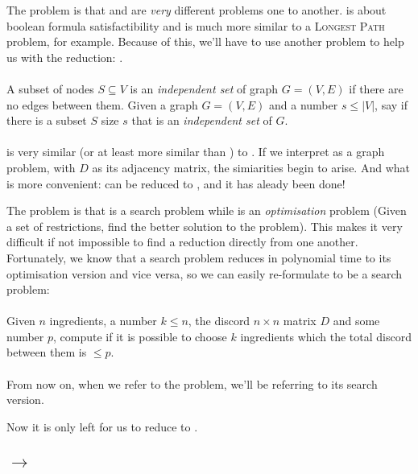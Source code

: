 The problem is that \tsat{} and \exc{} are \textit{very} different problems one to another. \tsat{} is about boolean formula satisfactibility and \exc{} is much more similar to a \textsc{Longest Path} problem, for example. Because of this, we'll have to use another problem to help us with the reduction: \is{}.

\paragraph{\is{}}
A subset of nodes $S \subseteq V$ is an \textit{independent set} of graph $G = (V,E)$ if there are no edges between them. Given a graph $G = (V,E)$ and a number $s \leq |V|$, say if there is a subset $S$ size $s$ that is an \textit{independent set} of $G$.
\\ \\
\is{} is very similar (or at least more similar than \tsat{}) to \exc{}. If we interpret \exc{} as a graph problem, with $D$ as its adjacency matrix, the simiarities begin to arise. And what is more convenient: \tsat{} can be reduced to \is{}, and it has aleady been done\cite[p. 262]{algorithms}!

The problem is that \is{} is a search problem while \exc{} is an \textit{optimisation} problem (Given a set of restrictions, find the better solution to the problem). This makes it very difficult if not impossible to find a reduction directly from one another. Fortunately, we know that a search problem reduces in polynomial time to its optimisation version and vice versa\cite[p. 250]{algorithms}, so we can easily re-formulate \exc{} to be a search problem:

\paragraph{\exc{}}
Given $n$ ingredients, a number $k \leq n$, the discord $n \times n$ matrix $D$ and some number $p$, compute if it is possible to choose $k$ ingredients which the total discord between them is $\leq p$.
\\ \\
From now on, when we refer to the problem, we'll be referring to its search version.

Now it is only left for us to reduce \is{} to \exc{}.

\subsection*{\is{} $\longrightarrow$ \exc{}}

